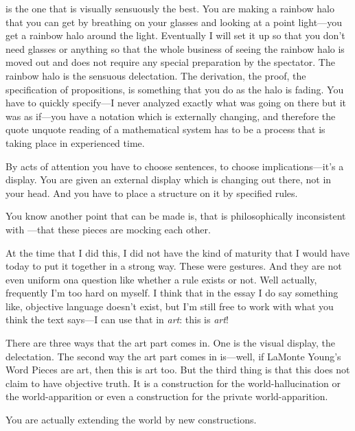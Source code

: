  is the one that is visually sensuously the best. You are 
making a rainbow halo that you can get by breathing on your glasses 
and looking at a point light---you get a rainbow halo around the light. 
Eventually I will set it up so that you don't need glasses or anything so 
that the whole business of seeing the rainbow halo is moved out and 
does not require any special preparation by the spectator. The rainbow 
halo is the sensuous delectation. The derivation, the proof, the 
specification of propositions, is something that you do as the halo is fading. 
You have to quickly specify---I never analyzed exactly what was going 
on there but it was as if---you have a notation which is externally 
changing, and therefore the quote unquote reading of a mathematical 
system has to be a process that is taking place in experienced time. 

By acts of attention you have to choose sentences, to choose 
implications---it's a display. You are given an external display which is 
changing out there, not in your head. And you have to place a structure 
on it by specified rules. 

You know another point that can be made is, that  is 
philosophically inconsistent with ---that these pieces 
are mocking each other. 

At the time that I did this, I did not have the kind of maturity that I 
would have today to put it together in a strong way. These were 
gestures. And they are not even uniform ona question like whether a 
rule exists or not. Well actually, frequently I'm too hard on myself. I 
think that in the essay  I do say something like, objective 
language doesn't exist, but I'm still free to work with what you think the 
text says---I can use that in \emph{art}: this is \emph{art}! 

There are three ways that the art part comes in. One is the visual 
display, the delectation. The second way the art part comes in is---well, 
if LaMonte Young's Word Pieces are art, then this is art too. But the 
third thing is that this does not claim to have objective truth. It is a 
construction for the world-hallucination or the world-apparition or 
even a construction for the private world-apparition. 

 You are actually extending the world by new constructions. 

